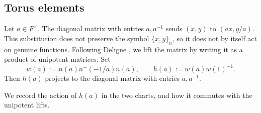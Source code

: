 \documentclass[reqno]{amsart}
\theoremstyle{plain}
\theoremstyle{definition}
\theoremstyle{itplain}
\numberwithin{equation}{section}
\numberwithin{theorem}{section}
\begin{document}
\subsection{Torus elements}\label{sec:torus}
Let $a \in F^\times$.  The diagonal matrix with entries $a, a^{-1}$ sends $(x, y)$ to $(a x, y/a)$.  This substitution does not preserve the symbol $\{x, y\}_n$, so it does not by itself act on genuine functions.  Following Deligne \cite[\S1.9]{SB_1978-1979__21__244_0}, we lift the matrix by writing it as a product of unipotent matrices.  Set
\begin{equation*}
  w(a) := n(a) n^-(-1/a) n(a),
  \qquad
  h(a) := w(a) w(1)^{-1}.
\end{equation*}
Then $h(a)$ projects to the diagonal matrix with entries $a, a^{-1}$.

We record the action of $h(a)$ in the two charts, and how it commutes with the unipotent lifts.
\end{document}

